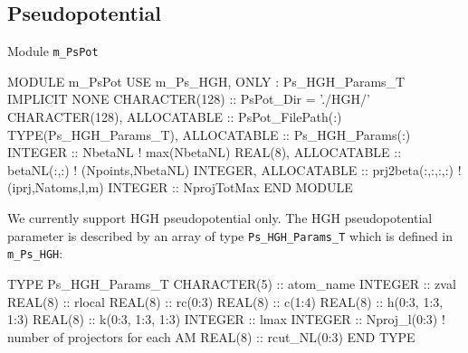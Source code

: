 \subsection{Pseudopotential}

Module {\tt m\_PsPot}

\begin{fortrancode}
MODULE m_PsPot
  USE m_Ps_HGH, ONLY : Ps_HGH_Params_T
  IMPLICIT NONE 
  CHARACTER(128) :: PsPot_Dir = './HGH/'
  CHARACTER(128), ALLOCATABLE :: PsPot_FilePath(:)
  TYPE(Ps_HGH_Params_T), ALLOCATABLE :: Ps_HGH_Params(:)
  INTEGER :: NbetaNL  ! max(NbetaNL)
  REAL(8), ALLOCATABLE :: betaNL(:,:) ! (Npoints,NbetaNL)
  INTEGER, ALLOCATABLE :: prj2beta(:,:,:,:) ! (iprj,Natoms,l,m)
  INTEGER :: NprojTotMax
END MODULE 
\end{fortrancode}

We currently support HGH pseudopotential only.
The HGH pseudopotential parameter is described by an array of type {\tt Ps\_HGH\_Params\_T}
which is defined in {\tt m\_Ps\_HGH}:

\begin{fortrancode}
TYPE Ps_HGH_Params_T
  CHARACTER(5) :: atom_name
  INTEGER :: zval
  REAL(8) :: rlocal
  REAL(8) :: rc(0:3)
  REAL(8) :: c(1:4)
  REAL(8) :: h(0:3, 1:3, 1:3)
  REAL(8) :: k(0:3, 1:3, 1:3)
  INTEGER :: lmax
  INTEGER :: Nproj_l(0:3)  ! number of projectors for each AM
  REAL(8) :: rcut_NL(0:3)
END TYPE
\end{fortrancode}



